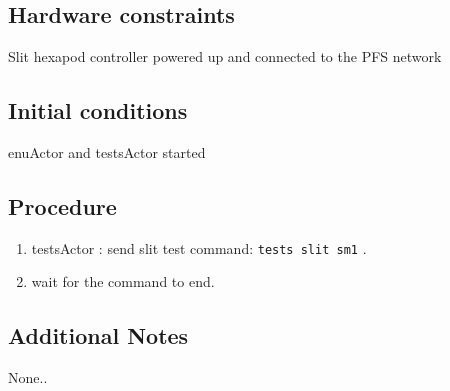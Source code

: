 \subsection{Hardware constraints}

Slit hexapod controller powered up and connected to the PFS network

\subsection{Initial conditions}
enuActor and testsActor started

\subsection{Procedure}

\begin{enumerate}
    \item testsActor : send slit test command: \texttt{tests slit sm1} .
    \item wait for the command to end.
\end{enumerate}



\subsection{Additional Notes}

None..
